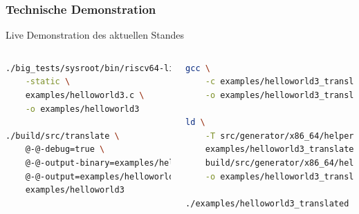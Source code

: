 \begin{frame}[fragile]
    \frametitle{Technische Demonstration}{Live Demonstration des aktuellen Standes}


    \begin{columns}[c]
        \begin{lstlisting}[language=bash, basicstyle=\small\ttfamily, extendedchars=true,escapeinside={@@}]
./big_tests/sysroot/bin/riscv64-linux-gnu-gcc \
    -static \
    examples/helloworld3.c \
    -o examples/helloworld3

./build/src/translate \
    @-@-debug=true \
    @-@-output-binary=examples/helloworld3.bin \
    @-@-output=examples/helloworld3_translated.s \
    examples/helloworld3
    \end{lstlisting}

        \begin{lstlisting}[language=bash, basicstyle=\small\ttfamily, extendedchars=true,escapeinside={@@}]
gcc \
    -c examples/helloworld3_translated.s \
    -o examples/helloworld3_translated.o

ld \
    -T src/generator/x86_64/helper/link.ld \
    examples/helloworld3_translated.o \
    build/src/generator/x86_64/helper/libhelper.a \
    -o examples/helloworld3_translated

./examples/helloworld3_translated
    \end{lstlisting}
    \end{columns}
\end{frame}
